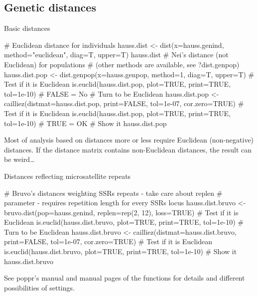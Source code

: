 \documentclass[compress, ucs, xelatex, 11pt, xcolor=svgnames,
  hyperref={
    bookmarks=true,
    unicode=true,
    colorlinks=true,
    pdftitle={Molecular data in R},
    plainpages=false,
    pdfauthor={Vojtech Zeisek},
    pdfsubject={Course about phylogeny and evolution in R},
    pdfcreator={XeLaTeX},
    pdfkeywords={R, evolution, phylogeny, molecular data},
    linkcolor=Tomato,
    anchorcolor=SaddleBrown,
    citecolor=Goldenrod,
    filecolor=DarkMagenta,
    menucolor=Sienna,
    urlcolor=DarkTurquoise,
    pdftex},
  url={hyphens, lowtilde} %
  ]{beamer}
\begin{document}
\subsection{Genetic distances}

\begin{frame}[fragile]{Basic distances}
  \begin{spluscode}
    # Euclidean distance for individuals
    hauss.dist <- dist(x=hauss.genind, method="euclidean", diag=T, upper=T)
    hauss.dist
    # Nei's distance (not Euclidean) for populations
    # (other methods are available, see ?dist.genpop)
    hauss.dist.pop <- dist.genpop(x=hauss.genpop, method=1, diag=T, upper=T)
    # Test if it is Euclidean
    is.euclid(hauss.dist.pop, plot=TRUE, print=TRUE, tol=1e-10) # FALSE = No
    # Turn to be Euclidean
    hauss.dist.pop <- cailliez(distmat=hauss.dist.pop, print=FALSE,
      tol=1e-07, cor.zero=TRUE)
    # Test if it is Euclidean
    is.euclid(hauss.dist.pop, plot=TRUE, print=TRUE, tol=1e-10) # TRUE = OK
    # Show it
    hauss.dist.pop
  \end{spluscode}
Most of analysis based on distances more or less require Euclidean (non-negative) distances. If the distance matrix contains non-Euclidean distances, the result can be weird\ldots
\end{frame}

\begin{frame}[fragile]{Distances reflecting microsatellite repeats}
  \begin{spluscode}
    # Bruvo's distances weighting SSRs repeats - take care about replen
    # parameter - requires repetition length for every SSRs locus
    hauss.dist.bruvo <- bruvo.dist(pop=hauss.genind, replen=rep(2, 12),
      loss=TRUE)
    # Test if it is Euclidean
    is.euclid(hauss.dist.bruvo, plot=TRUE, print=TRUE, tol=1e-10)
    # Turn to be Euclidean
    hauss.dist.bruvo <- cailliez(distmat=hauss.dist.bruvo, print=FALSE,
      tol=1e-07, cor.zero=TRUE)
    # Test if it is Euclidean
    is.euclid(hauss.dist.bruvo, plot=TRUE, print=TRUE, tol=1e-10)
    # Show it
    hauss.dist.bruvo
  \end{spluscode}
See poppr's manual and manual pages of the functions for details and different possibilities of settings.
\end{frame}
\end{document}
